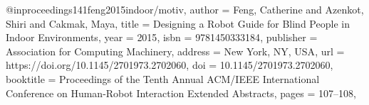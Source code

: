 @inproceedings{141feng2015indoor/motiv,
author = {Feng, Catherine and Azenkot, Shiri and Cakmak, Maya},
title = {Designing a Robot Guide for Blind People in Indoor Environments},
year = {2015},
isbn = {9781450333184},
publisher = {Association for Computing Machinery},
address = {New York, NY, USA},
url = {https://doi.org/10.1145/2701973.2702060},
doi = {10.1145/2701973.2702060},
booktitle = {Proceedings of the Tenth Annual ACM/IEEE International Conference on Human-Robot Interaction Extended Abstracts},
pages = {107–108},
}